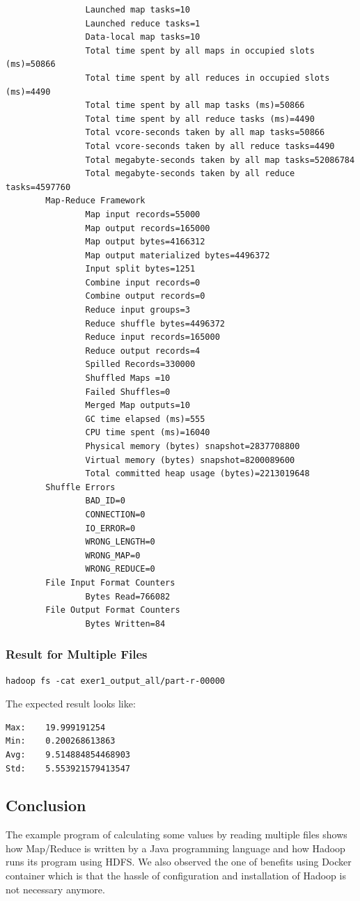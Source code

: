\begin{lstlisting}
                Launched map tasks=10
                Launched reduce tasks=1
                Data-local map tasks=10
                Total time spent by all maps in occupied slots (ms)=50866
                Total time spent by all reduces in occupied slots (ms)=4490
                Total time spent by all map tasks (ms)=50866
                Total time spent by all reduce tasks (ms)=4490
                Total vcore-seconds taken by all map tasks=50866
                Total vcore-seconds taken by all reduce tasks=4490
                Total megabyte-seconds taken by all map tasks=52086784
                Total megabyte-seconds taken by all reduce tasks=4597760
        Map-Reduce Framework
                Map input records=55000
                Map output records=165000
                Map output bytes=4166312
                Map output materialized bytes=4496372
                Input split bytes=1251
                Combine input records=0
                Combine output records=0
                Reduce input groups=3
                Reduce shuffle bytes=4496372
                Reduce input records=165000
                Reduce output records=4
                Spilled Records=330000
                Shuffled Maps =10
                Failed Shuffles=0
                Merged Map outputs=10
                GC time elapsed (ms)=555
                CPU time spent (ms)=16040
                Physical memory (bytes) snapshot=2837708800
                Virtual memory (bytes) snapshot=8200089600
                Total committed heap usage (bytes)=2213019648
        Shuffle Errors
                BAD_ID=0
                CONNECTION=0
                IO_ERROR=0
                WRONG_LENGTH=0
                WRONG_MAP=0
                WRONG_REDUCE=0
        File Input Format Counters
                Bytes Read=766082
        File Output Format Counters
                Bytes Written=84
\end{lstlisting}


\subsubsection{Result for Multiple Files}

\begin{lstlisting}
hadoop fs -cat exer1_output_all/part-r-00000
\end{lstlisting}

The expected result looks like:

\begin{lstlisting}
Max:    19.999191254
Min:    0.200268613863
Avg:    9.514884854468903
Std:    5.553921579413547
\end{lstlisting}

\subsection{Conclusion}

The example program of calculating some values by reading multiple files shows
how Map/Reduce is written by a Java programming language and how Hadoop runs
its program using HDFS. We also observed the one of benefits using Docker
container which is that the hassle of configuration and installation of Hadoop
is not necessary anymore.


